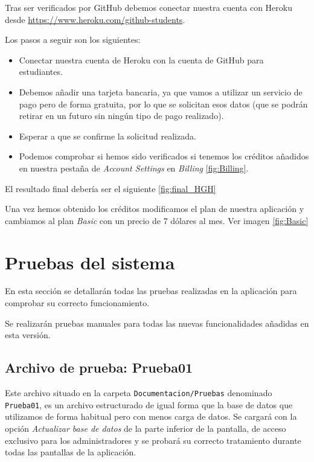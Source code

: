 


Tras ser verificados por GitHub debemos conectar nuestra cuenta con Heroku desde \href{https://www.heroku.com/github-students}{https://www.heroku.com/github-students}.

Los pasos a seguir son los siguientes:
\begin{itemize}
	\item Conectar nuestra cuenta de Heroku con la cuenta de GitHub para estudiantes.
	\item Debemos añadir una tarjeta bancaria, ya que vamos a utilizar un servicio de pago pero de forma gratuita, por lo que se solicitan esos datos (que se podrán retirar en un futuro sin ningún tipo de pago realizado).
	\item Esperar a que se confirme la solicitud realizada.
	\item Podemos comprobar si hemos sido verificados si tenemos los créditos añadidos en nuestra pestaña de \emph{Account Settings} en \emph{Billing} \ref{fig:Billing}.
\end{itemize}
El resultado final debería ser el siguiente \ref{fig:final_HGH}


Una vez hemos obtenido los créditos modificamos el plan de nuestra aplicación y cambiamos al plan \emph{Basic} con un precio de 7 dólares al mes. Ver imagen \ref{fig:Basic}


\section{Pruebas del sistema}

En esta sección se detallarán todas las pruebas realizadas en la aplicación para comprobar su correcto funcionamiento.

Se realizarán pruebas manuales para todas las nuevas funcionalidades añadidas en esta versión.

\subsection{Archivo de prueba: Prueba01}
Este archivo situado en la carpeta \texttt{Documentacion/Pruebas} denominado \texttt{Prueba01}, es un archivo estructurado de igual forma que la base de datos que utilizamos de forma habitual pero con menos carga de datos.
Se cargará con la opción \emph{Actualizar base de datos} de la parte inferior de la pantalla, de acceso exclusivo para los administradores y se probará su correcto tratamiento durante todas las pantallas de la aplicación.


